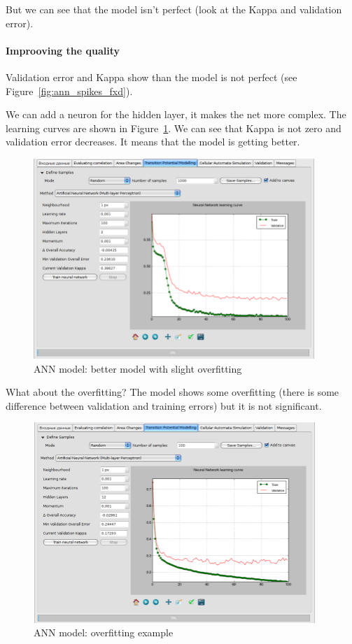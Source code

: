 \documentclass{report}
\begin{document}
But we can see that the model isn't perfect (look at the Kappa and validation error).

\paragraph{Improoving the quality} Validation error and Kappa show than the model is not perfect (see Figure~\ref{fig:ann_spikes_fxd}).

We can add a neuron for the hidden layer, it makes the net more complex. The learning curves are shown in Figure~\ref{fig:ann_2neurons}.
We can see that Kappa is not zero and validation error decreases. It means that the model is getting better. 

\begin{figure}[h!]
\centering
\includegraphics[width=0.95\textwidth]{img/ann_2neurons.png}
\caption{ANN model: better model with slight overfitting}
\label{fig:ann_2neurons}
\end{figure}

What about the overfitting? The model shows some overfitting (there is some difference between validation and training errors) but it is not significant.

\begin{figure}[h!]
\centering
\includegraphics[width=0.95\textwidth]{img/ann_overfitting.png}
\caption{ANN model: overfitting example}
\label{fig:ann_overfitting}
\end{figure}
\end{document}

